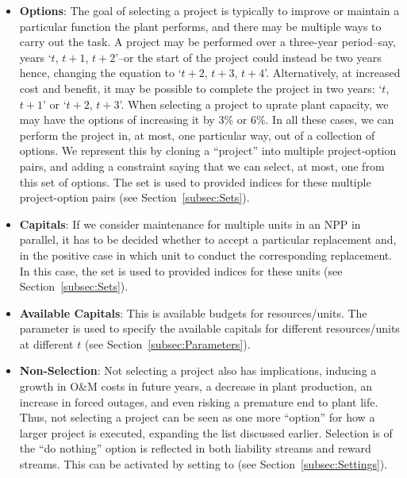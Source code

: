 \begin{itemize}
  \item \textbf{Options}: The goal of selecting a project is typically to improve or maintain
  a particular function the plant performs, and there may be multiple ways to carry out
  the task. A project may be performed over a three-year period--say, years `$t$, $t+1$, $t+2$'--or the
  start of the project could instead be two years hence, changing the equation to
  `$t+2$, $t+3$, $t+4$'. Alternatively, at increased cost and benefit, it may be
  possible to complete the project in two years: `$t$, $t+1$' or `$t+2$, $t+3$'. When selecting a project
  to uprate plant capacity, we may have the options of increasing it by 3\% or 6\%.
  In all these cases, we can perform the project in, at most, one particular way, out of a collection of
  options. We represent this by cloning a “project” into multiple project-option pairs,
  and adding a constraint saying that we can select, at most, one from this set of options.
  The set  is used to provided indices for these multiple project-option pairs
  (see Section~\ref{subsec:Sets}).

  \item \textbf{Capitals}: If we consider maintenance for multiple units in an NPP in parallel,
  it has to be decided whether to accept a particular replacement and, in the positive
  case in which unit to conduct the corresponding replacement. In this case, the set 
  is used to provided indices for these units (see Section~\ref{subsec:Sets}).

  \item \textbf{Available Capitals}: This is available budgets for resources/units. The parameter
   is used to specify the available capitals for different
  resources/units at different $t$ (see Section~\ref{subsec:Parameters}).

  \item \textbf{Non-Selection}: Not selecting a project also has implications, inducing a growth
  in O\&M costs in future years, a decrease in plant production, an increase in forced outages,
  and even risking a premature end to plant life. Thus, not selecting a project can be seen as
  one more “option” for how a larger project is executed, expanding the list discussed earlier.
  Selection is of the “do nothing” option is reflected in both liability streams and reward
  streams. This can be activated by setting  to 
  (see Section~\ref{subsec:Settings}).


\end{itemize}
